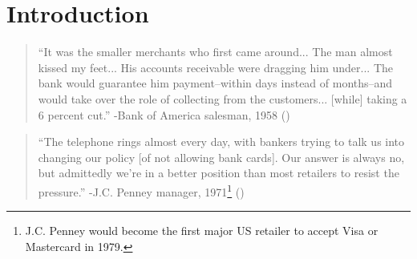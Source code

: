 \documentclass[12pt,english]{article}
\begin{document}
\begin{abstract}
\begin{singlespace} \vspace{-0.3cm}
\noindent 
Before 1970, most short-term U.S.\ consumer credit was extended by merchants; today banks extend it through credit cards. Using the 1978 \emph{Marquette} decision, which unexpectedly ended binding usury regulation, I estimate that the induced 20\% decline in merchant lending raised retail net entry---my proxy for merchant profits---by about 4\%, most for small firms. New establishment-level data on card acceptance, hand-collected from archival Yellow Pages, combined with a model separating cost reduction from merchant substitutability, show lower costs rather than competition drive the effect: banks' scale and risk-bearing cut accepting merchants' costs by roughly 4\%. %

\end{singlespace}

\vspace{0.25cm}

\begin{singlespace}
\noindent \textbf{JEL:} N12, N22, G21, G28, G51, L81, D22

\end{singlespace}
\end{abstract}
\vfill{}
\thispagestyle{empty}

\section{Introduction}\label{sec:intro}

\begin{quote}
    ``It was the smaller merchants who first came around... The man almost kissed my feet... His accounts receivable were dragging him under... \newline
    The bank would guarantee him payment--within days instead of months--and would take over the role of collecting from the customers... [while] taking a 6 percent cut.'' \newline 
    -Bank of America salesman, 1958 (\cite{nocera_piece_2013})
\end{quote}

\begin{quote}
    ``The telephone rings almost every day, with bankers trying to talk us into changing our policy [of not allowing  bank cards]. Our answer is always no, but admittedly we're in a better position than most retailers to resist the pressure.'' \newline 
    -J.C. Penney manager, 1971\footnote{J.C. Penney would become the first major US retailer to accept Visa or Mastercard in 1979.} (\cite{hyman_borrow_2012})
\end{quote}
\end{document}
